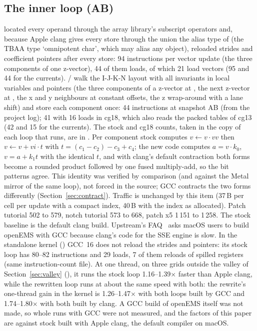 \subsection{The inner loop (AB)}
 located every operand through the array library's subscript
operators and, because Apple clang gives every store through the  union the alias type of 
(the TBAA type `omnipotent char', which may alias any object), reloaded strides and coefficient pointers after every
store: 94 instructions per vector update (the three components of one z-vector), 44 of them loads, of which 21 load
vectors (95 and 44 for the currents).  /  walk the I-J-K-N
layout with all invariants in local variables and  pointers (the three components of a z-vector
at , the next z-vector at , the x and y neighbours at constant offsets, the z wrap-around
with a lane shift) and store each component once: 44 instructions at snapshot AB (from the project log); 41 with 16
loads in cg18, which also reads the packed tables of cg13 (42 and 15 for the currents). The stock and
cg18 counts, taken in the copy of each loop that runs, are in
. Per component
stock computes $v \leftarrow v\cdot vv$ then $v \leftarrow v + vi\cdot t$ with $t=(c_1-c_2)-c_3+c_4$; the new code
computes $a = v\cdot k_0$, $v = a + k_1 t$ with the identical $t$, and with clang's default contraction both forms
become a rounded product followed by one fused multiply-add, so the bit patterns agree. This identity was verified by
comparison (and against the Metal mirror of the same loop), not forced in the source; GCC contracts the two forms
differently (Section~\ref{sec:contract}). Traffic is unchanged by this item (37\,B per cell per update with a compact
index, 40\,B with the index as allocated). Patch tutorial 502 to 579, notch tutorial 573 to 668, patch x5 1\,151 to
1\,258. The stock baseline is the default clang build. Upstream's FAQ~\cite{biergaizi29} asks macOS users to build
openEMS with GCC because clang's code for the SSE engine is slow. In the standalone kernel
() GCC~16 does not reload the strides and pointers: its stock loop has 80--82
instructions and 29 loads, 7 of them reloads of spilled registers (same instruction-count file). At one thread, on
three grids outside the valley of Section~\ref{sec:valley} (),
it runs the stock loop 1.16--1.39$\times$ faster than Apple clang, while the rewritten loop runs at about the same
speed with both: the rewrite's one-thread gain in the kernel is 1.26--1.47$\times$ with both loops built by GCC and
1.74--1.80$\times$ with both built by clang. A GCC build of openEMS itself was not made, so whole runs with GCC were
not measured, and the factors of this paper are against stock built with Apple clang, the default compiler on macOS.

